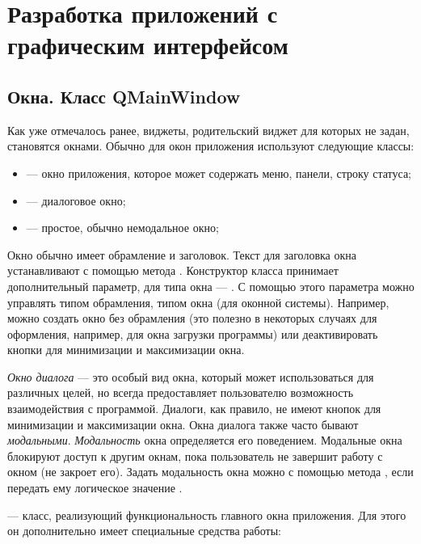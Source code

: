 \chapter[Разработка приложений с графическим интерфейсом]{Разработка приложений с графическим интерфейсом}
\section[Окна. Класс QMainWindow]{Окна. Класс QMainWindow}
Как уже отмечалось ранее, виджеты, родительский виджет для которых не задан, становятся окнами. Обычно для окон
приложения используют следующие классы:

\begin{itemize}
\item {} --- окно приложения, которое может содержать меню, панели,
строку статуса;
\item {} --- диалоговое окно;
\item {} --- простое, обычно немодальное окно;
\end{itemize}
Окно обычно имеет обрамление и заголовок. Текст для заголовка окна устанавливают с помощью метода
. Конструктор класса 
 принимает дополнительный параметр, для типа окна ---
. С помощью этого параметра можно
управлять типом обрамления, типом окна (для оконной системы). Например, можно создать окно без обрамления (это полезно
в некоторых случаях для оформления, например, для окна загрузки программы) или деактивировать кнопки для минимизации и
максимизации окна.

\emph{Окно диалога} --- это особый вид окна, который может использоваться для различных
целей, но всегда предоставляет пользователю возможность взаимодействия с программой. Диалоги, как правило, не имеют
кнопок для минимизации и максимизации окна. Окна диалога также часто бывают
\emph{модальными}.
\emph{Модальность} окна определяется его поведением.
Модальные окна блокируют доступ к другим окнам, пока пользователь не завершит работу с окном (не закроет его). Задать
модальность окна можно с помощью метода , если
передать ему логическое значение .

 --- класс, реализующий функциональность главного окна приложения. Для этого он дополнительно
имеет специальные средства работы:

